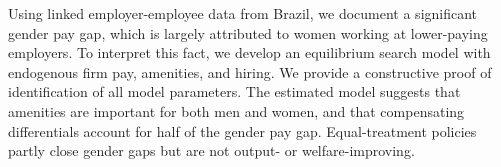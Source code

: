 


Using linked employer-employee data from Brazil, we document a significant gender pay gap, which is largely attributed to women working at lower-paying employers. To interpret this fact, we develop an equilibrium search model with endogenous firm pay, amenities, and hiring. We provide a constructive proof of identification of all model parameters. The estimated model suggests that amenities are important for both men and women, and that compensating differentials account for half of the gender pay gap. Equal-treatment policies partly close gender gaps but are not output- or welfare-improving.
